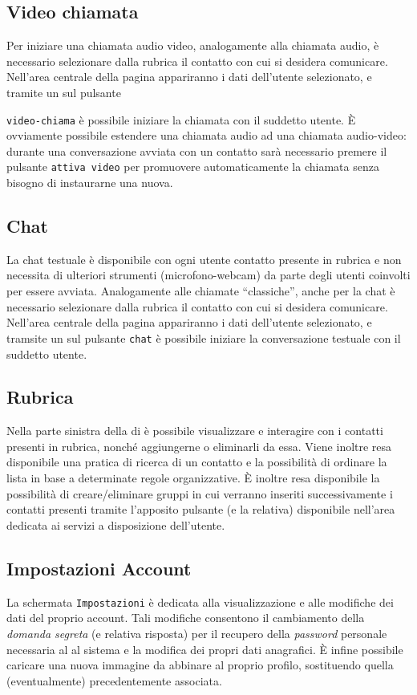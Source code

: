 \subsection{Video chiamata}
Per iniziare una chiamata audio video, analogamente alla chiamata audio, è necessario selezionare dalla rubrica il contatto con cui si desidera comunicare. Nell'area centrale della pagina appariranno i dati dell'utente selezionato, e tramite un  sul pulsante 

\texttt{video-chiama} è possibile iniziare la chiamata con il suddetto utente.
È ovviamente possibile estendere una chiamata audio ad una chiamata audio-video: durante una conversazione avviata con un contatto sarà necessario premere il pulsante \texttt{attiva video} per promuovere automaticamente la chiamata senza bisogno di instaurarne una nuova.

\subsection{Chat}
La chat testuale è disponibile con ogni utente contatto presente in rubrica e non necessita di ulteriori strumenti (microfono-webcam) da parte degli utenti coinvolti per essere avviata. Analogamente alle chiamate ``classiche'', anche per la chat è necessario selezionare dalla rubrica il contatto con cui si desidera comunicare. Nell'area centrale della pagina appariranno i dati dell'utente selezionato, e tramsite un  sul pulsante \texttt{chat} è possibile iniziare la conversazione testuale con il suddetto utente.

\subsection{Rubrica}
Nella parte sinistra della  di \caName{} è possibile visualizzare e interagire con i contatti presenti in rubrica, nonché aggiungerne o eliminarli da essa. 
Viene inoltre resa disponibile una pratica  di ricerca di un contatto e la possibilità di ordinare la lista in base a determinate regole organizzative. È inoltre resa disponibile la possibilità di creare/eliminare gruppi in cui verranno inseriti successivamente i contatti presenti tramite l'apposito pulsante (e la  relativa) disponibile nell'area dedicata ai servizi a disposizione dell'utente.

\subsection{Impostazioni Account}
La schermata \texttt{Impostazioni} è dedicata alla visualizzazione e alle modifiche dei dati del proprio account. Tali modifiche consentono il cambiamento della \textit{domanda segreta} (e relativa risposta) per il recupero della \textit{password} personale necessaria al  al sistema e la modifica dei propri dati anagrafici.
È infine possibile caricare una nuova immagine da abbinare al proprio profilo, sostituendo quella (eventualmente) precedentemente associata.


